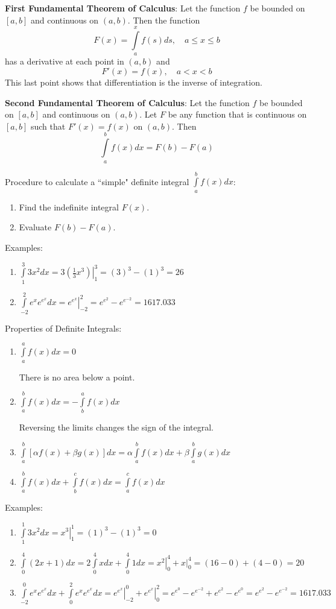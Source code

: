 \documentclass[20pt]{extarticle}
\newcommand{\be}{\begin{enumerate}}
\newcommand{\ee}{\end{enumerate}}
\newcommand{\pbt}{\parbox[t]{2in}}
\newcommand{\pbff}{\parbox[t]{4in}}
\newcommand{\lint}{\int\limits}
\begin{document}
\item {\bf First Fundamental Theorem of Calculus}:  Let the function $f$
be bounded on $[a,b]$ and continuous on $(a,b)$.  Then the function
$$F(x)=\lint_a^x f(s)ds, \quad a\le x\le b$$ has a derivative at each
point in $(a,b)$ and $$F'(x)=f(x), \quad a<x<b$$  This last point shows
that differentiation is the inverse of integration.

\item {\bf Second Fundamental Theorem of Calculus}:  Let the function
$f$ be bounded on $[a,b]$ and continuous on $(a,b)$.  Let $F$ be any
function that is continuous on $[a,b]$ such that $F'(x)=f(x)$ on
$(a,b)$.  Then $$\lint_a^bf(x)dx = F(b)-F(a)$$

\item Procedure to calculate a ``simple" definite integral $\lint_a^b
f(x)dx$:
  \be
  \item Find the indefinite integral $F(x)$.
  \item Evaluate $F(b)-F(a)$.
  \ee

\item Examples:
  \be
  \item $\lint_1^3 3x^2 dx=  \left. 3\left(\frac{1}{3} x^3\right) \right|_1^3 =
  (3)^3-(1)^3=26$
  \item $\lint_{-2}^2 e^x e^{e^x} dx = \left. e^{e^x} \right|_{-2}^2 =
  e^{e^{2}} -e^{e^{-2}}=1617.033 $
  \ee

\item Properties of Definite Integrals:
  \be
  \item \pbt{$\lint_a^a f(x)dx=0$}\pbff{There is no area below a point.}
  \item \pbt{$\lint_a^b f(x)dx=-\lint_b^a f(x)dx$}\pbff{Reversing the
limits changes the sign of the integral.}
  \item $\lint_a^b [\alpha f(x)+\beta g(x)]dx = \alpha \lint_a^b f(x)dx
+ \beta \lint_a^b g(x)dx$
  \item $\lint_a^b f(x) dx +\lint_b^c f(x)dx = \lint_a^c f(x)dx$
  \ee

\item Examples:
  \be
  \item $\lint_1^1 3x^2 dx = \left. x^3 \right|_1^1 =
 (1)^3-  (1)^3=0$
  \item $\lint_0^4 (2x+1)dx= 2\lint_0^4 x dx + \lint_0^4 1 dx =
\left. x^2 \right|_0^4 +\left. x \right|_0^4 = (16-0)+(4-0)=20 $
  \item $\lint_{-2}^0 e^x e^{e^x} dx + \lint_0^2 e^x e^{e^x} dx =
  \left. e^{e^x} \right|_{-2}^0 + \left. e^{e^x} \right|_{0}^2 =
  e^{e^{0}} -e^{e^{-2}} + e^{e^{2}} -e^{e^{0}}=
  e^{e^{2}} -e^{e^{-2}}=1617.033 $
  \ee
\end{document}
